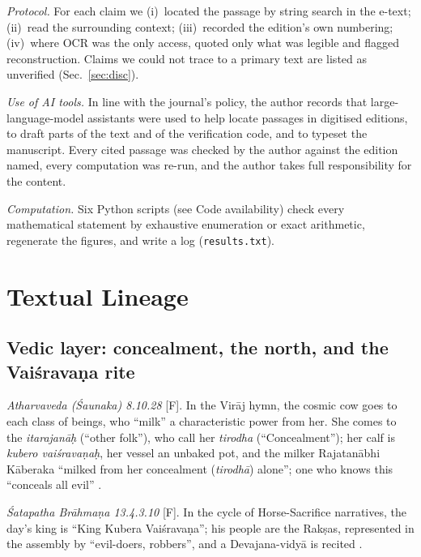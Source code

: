 \documentclass[pdflatex,sn-basic]{sn-jnl}
\theoremstyle{thmstyleone}
\theoremstyle{thmstylethree}
\newcommand{\Fact}{\textsf{[F]}}
\begin{document}
\emph{Protocol.} For each claim we (i)~located the passage by string search in the e-text; (ii)~read the surrounding context; (iii)~recorded the edition's own numbering; (iv)~where OCR was the only access, quoted only what was legible and flagged reconstruction. Claims we could not trace to a primary text are listed as unverified (Sec.~\ref{sec:disc}).

\emph{Use of AI tools.} In line with the journal's policy, the author records that large-language-model assistants were used to help locate passages in digitised editions, to draft parts of the text and of the verification code, and to typeset the manuscript. Every cited passage was checked by the author against the edition named, every computation was re-run, and the author takes full responsibility for the content.

\emph{Computation.} Six Python scripts (see Code availability) check every mathematical statement by exhaustive enumeration or exact arithmetic, regenerate the figures, and write a log (\texttt{results.txt}).

\section{Textual Lineage}
\label{sec:texts}

\subsection{Vedic layer: concealment, the north, and the Vai\'srava\d na rite}
\emph{Atharvaveda (\'Saunaka) 8.10.28} \Fact. In the Vir\=aj hymn, the cosmic cow goes to each class of beings, who ``milk'' a characteristic power from her. She comes to the \emph{itarajan\=a\d h} (``other folk''), who call her \emph{tirodha} (``Concealment''); her calf is \emph{kubero vai\'srava\d na\d h}, her vessel an unbaked pot, and the milker Rajatan\=abhi K\=aberaka ``milked from her concealment (\emph{tirodh\=a}) alone''; one who knows this ``conceals all evil'' \citep{titus_avs}.

\emph{\'Satapatha Br\=ahma\d na 13.4.3.10} \Fact. In the cycle of Horse-Sacrifice narratives, the day's king is ``King Kubera Vai\'srava\d na''; his people are the Rak\d sas, represented in the assembly by ``evil-doers, robbers'', and a Devajana-vidy\=a is recited \citep{eggeling1900sbe44}.
\end{document}
